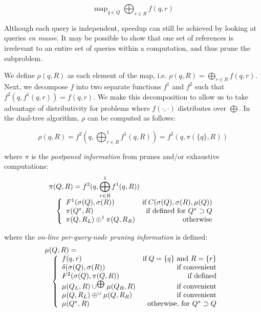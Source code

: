 \documentclass[times, 10pt,twocolumn]{article}
\newcommand{\union}{\cup}
\DeclareMathOperator*{\map}{map}
\DeclareMathOperator{\IF}{if}
\newcommand{\muv}{\union^{\bigoplus}}
\newcommand{\muh}{\oplus^{\union}}
\begin{document}
  $$\map_{q \in Q} \bigoplus_{r \in R} f(q, r)$$

Although each query is independent, speedup can still be achieved by looking at queries {\it en masse}.
It may be possible to show that one set of references is irrelevant to an entire set of queries within a computation, and thus prune the subproblem.

We define $\rho(q, R)$ as each element of the map, i.e. $\rho(q, R) = \bigoplus_{r \in R} f(q, r)$.
Next, we decompose $f$ into two separate functions $f^1$ and $f^2$ such that $f^2(q, f^1(q, r)) = f(q, r)$.
We make this decomposition to allow us to take advantage of distributivity for problems where $f(\cdot, \cdot)$ distributes over $\bigoplus$.
In the dual-tree algorithm, $\rho$ can be computed as follows:

\begin{equation}
  \label{eqn:rho}
  \rho(q, R) = f^{2}(q, \bigoplus^{1}_{r \in R} f^{1}(q, R)) = f^{2}(q, \pi(\{q\}, R))
  \end{equation}
  
\noindent where $\pi$ is the {\it postponed information} from prunes and/or exhaustive computations:
\begin{equation}
\label{eqn:pi}
 \begin{array}{ll}
  \lefteqn{\pi(Q, R) = f^{2}(q, \bigoplus^{1}_{r \in R} f^{1}(q, R))}
  \\
  & \left\{
    \begin{array}{lr}
      F^{1}(\sigma(Q), \sigma(R)) & \IF C(\sigma(Q), \sigma(R), \mu(Q))
      \\
      \pi(Q^{*}, R) & \mbox{if defined for } Q^{*} \supset Q
      \\
      \pi(Q, R_L) \oplus^{1} \pi(Q, R_R) & \mbox{otherwise}
    \end{array}
  \right.
 \end{array}
\end{equation}

\noindent where the {\it on-line per-query-node pruning information} is defined:
\begin{equation}
\label{eqn:mu}
 \begin{array}{ll}
  \lefteqn{\mu(Q, R) =}
  \\
  & \left\{
    \begin{array}{lr}
      f(q, r) & \IF Q = \{q\} \mbox{ and } R = \{r\}
      \\
      \delta(\sigma(Q), \sigma(R)) & \mbox{if convenient}
      \\
      F^2(\sigma(Q), \pi(Q, R)) & \mbox{if defined}
      \\
      \mu(Q_L, R) \muv \mu(Q_R, R) & \mbox{if convenient}
      \\
      \mu(Q, R_L) \muh \mu(Q, R_R) & \mbox{if convenient}
      \\
      \mu(Q^{*}, R) & \mbox{otherwise, for } Q^{*} \supset Q
    \end{array}
  \right.
 \end{array}
\end{equation}
\end{document}
